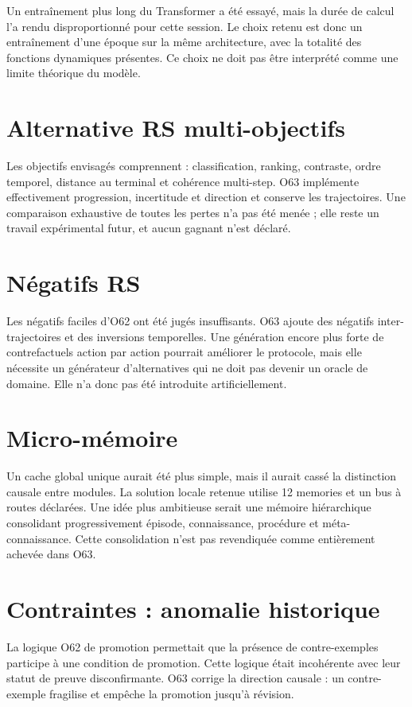 \documentclass[11pt,a4paper]{article}
\begin{document}
Un entraînement plus long du Transformer a été essayé, mais la durée de calcul l’a rendu disproportionné pour cette session. Le choix retenu est donc un entraînement d’une époque sur la même architecture, avec la totalité des fonctions dynamiques présentes. Ce choix ne doit pas être interprété comme une limite théorique du modèle.

\section{Alternative RS multi-objectifs}
Les objectifs envisagés comprennent : classification, ranking, contraste, ordre temporel, distance au terminal et cohérence multi-step. O63 implémente effectivement progression, incertitude et direction et conserve les trajectoires. Une comparaison exhaustive de toutes les pertes n’a pas été menée ; elle reste un travail expérimental futur, et aucun gagnant n’est déclaré.

\section{Négatifs RS}
Les négatifs faciles d’O62 ont été jugés insuffisants. O63 ajoute des négatifs inter-trajectoires et des inversions temporelles. Une génération encore plus forte de contrefactuels action par action pourrait améliorer le protocole, mais elle nécessite un générateur d’alternatives qui ne doit pas devenir un oracle de domaine. Elle n’a donc pas été introduite artificiellement.

\section{Micro-mémoire}
Un cache global unique aurait été plus simple, mais il aurait cassé la distinction causale entre modules. La solution locale retenue utilise 12 memories et un bus à routes déclarées. Une idée plus ambitieuse serait une mémoire hiérarchique consolidant progressivement épisode, connaissance, procédure et méta-connaissance. Cette consolidation n’est pas revendiquée comme entièrement achevée dans O63.

\section{Contraintes : anomalie historique}
La logique O62 de promotion permettait que la présence de contre-exemples participe à une condition de promotion. Cette logique était incohérente avec leur statut de preuve disconfirmante. O63 corrige la direction causale : un contre-exemple fragilise et empêche la promotion jusqu’à révision.
\end{document}
